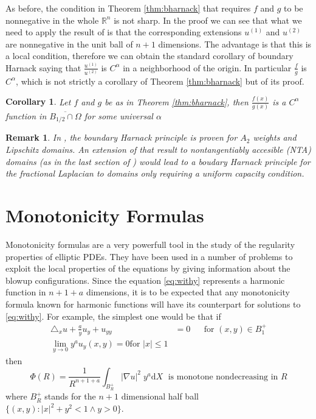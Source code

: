 \documentclass[letterpaper]{article}
\newtheorem{cor}[thm]{Corollary}
\newtheorem{preremark}[thm]{Remark}
\newenvironment{remark}{\begin{preremark}\rm}{\medskip \end{preremark}}
\numberwithin{equation}{section}
\newcommand{\abs}[1]{\left\vert#1\right\vert}
\newcommand{\R}{\mathbb R}
\newcommand{\grad} {\nabla}
\newcommand{\lap} {\triangle}
\newcommand{\Ly}[1]{\lap_x #1 + \frac{a}{y} #1_y + #1_{yy}}
\newcommand{\party}[1] {#1_y}
\newcommand{\ydd} {\; y^a \mathrm{d}}
\begin{document}
As before, the condition in Theorem \ref{thm:bharnack} that requires $f$ and $g$ to be nonnegative in the whole $\R^n$ is not sharp. In the proof we can see that what we need to apply the result of \cite{FKJ} is that the corresponding extensions $u^{(1)}$ and $u^{(2)}$ are nonnegative in the unit ball of $n+1$ dimensions. The advantage is that this is a local condition, therefore we can obtain the standard corollary of boundary Harnack saying that $\frac{u^{(1)}}{u^{(2)}}$ is $C^\alpha$ in a neighborhood of the origin. In particular $\frac{f}{g}$ is $C^\alpha$, which is not strictly a corollary of Theorem \ref{thm:bharnack} but of its proof.

\begin{cor}
Let $f$ and $g$ be as in Theorem \ref{thm:bharnack}, then $\frac{f(x)}{g(x)}$ is a $C^\alpha$ function in $\overline{B_{1/2} \cap \Omega}$ for some universal $\alpha$ 
\end{cor}

\begin{remark}
In \cite{FKJ}, the boundary Harnack principle is proven for $A_2$ weights and Lipschitz domains. An extension of that result to nontangentiably accesible (NTA) domains (as in the last section of \cite{ACS}) would lead to a boudary Harnack principle for the fractional Laplacian to domains only requiring a uniform capacity condition.
\end{remark}

\section{Monotonicity Formulas}
Monotonicity formulas are a very powerfull tool in the study of the regularity properties of elliptic PDEs. They have been used in a number of problems to exploit the local properties of the equations by giving information about the blowup configurations. Since the equation \eqref{eq:withy} represents a harmonic function in $n+1+a$ dimensions, it is to be expected that any monotonicity formula known for harmonic functions will have its counterpart for solutions to \eqref{eq:withy}. For example, the simplest one would be that if
\begin{align*}
\Ly u &= 0 && \text{for $(x,y)$} \in B_1^+ \\
\lim_{y \to 0} y^a \party u(x,y)=0 \text{for } |x| \leq 1
\end{align*}
then
\[ \Phi(R) = \frac{1}{R^{n+1+a}} \int_{B_R^+} \abs{\grad u}^2 \ydd X \; \text{  is monotone nondecreasing in $R$}\]
where $B_R^+$ stands for the $n+1$ dimensional half ball $\{(x,y) : \abs{x}^2 + y^2 < 1 \wedge y>0\}$.
\end{document}
